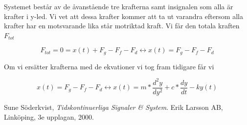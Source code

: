 \documentclass[10pt,a4paper]{article}
\begin{document}
Systemet består av de åvanstående tre krafterna samt insignalen som alla är krafter i y-led. Vi vet att dessa krafter kommer att ta ut varandra eftersom alla krafter har en motsvarande lika står motriktad kraft. Vi får den totala kraften $F_{tot}$

\begin{equation}
F_{tot} = 0 = x(t) + F_g - F_f - F_d \leftrightarrow x(t) = F_g - F_f - F_d 
\end{equation}

Om vi ersätter krafterna med de ekvationer vi tog fram tidigare får vi

\begin{equation}
x(t) = F_g - F_f - F_d \leftrightarrow x(t) = m*\frac{d^2y}{dy^2} + c*\frac{dy}{dt} -ky(t)
\end{equation}

\newpage

\begin{thebibliography}{9}

  Sune Söderkvist,
  \emph{Tidskontinuerliga Signaler \& System}.
  \linebreak
  Erik Larsson AB, Linköping,
  3e upplagan,
  2000.

\end{thebibliography}
\end{document}
